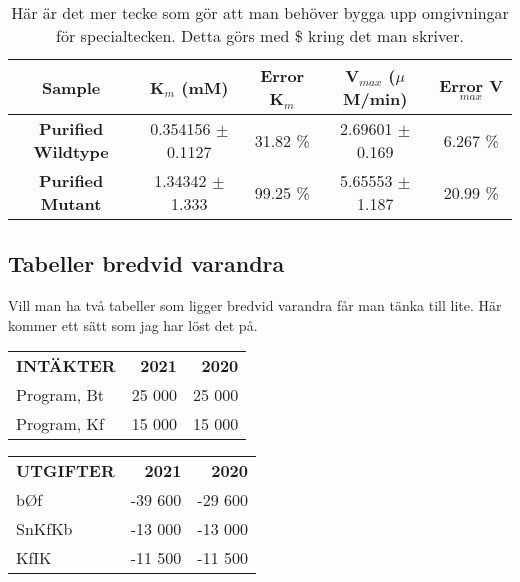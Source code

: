 \documentclass[]{article} %
\begin{document}
\begin{table}[H]
    \centering
        \caption{Här är det mer tecke som gör att man behöver bygga upp omgivningar för specialtecken. Detta görs med \$ kring det man skriver.}
    \begin{tabular}{|c|c|c|c|c|} \hline \hline
         \textbf{Sample} &  \textbf{K$_m$ (mM)} & \textbf{Error K$_m$} & \textbf{V$_{max}$ ($\mu$M/min)} & \textbf{Error V$_{max}$}\\ \hline
         \textbf{Purified Wildtype} & 0.354156 $\pm$ 0.1127 & 31.82 \% & 2.69601 $\pm$ 0.169 & 6.267 \% \\ \hline 
         \textbf{Purified Mutant} & 1.34342 $\pm$ 1.333 & 99.25 \% & 5.65553 $\pm$ 1.187 & 20.99 \% \\ \hline \hline
    \end{tabular}
    \label{tab:KmVmax}
\end{table}

\subsection{Tabeller bredvid varandra}
Vill man ha två tabeller som ligger bredvid varandra får man tänka till lite. Här kommer ett sätt som jag har löst det på.

\begin{center}
    

\begin{table}[!htb]
    \begin{minipage}{.5\linewidth}
      \centering
        \begin{tabular}{l r r}
            \textbf{INTÄKTER} & \textbf{2021} & \textbf{2020} \\
            Program, Bt & 25 000 & 25 000 \\
            Program, Kf & 15 000 & 15 000 \\
            
        \end{tabular}
    \end{minipage}%
    \begin{minipage}{.5\linewidth}
      \centering
        \begin{tabular}{l r r}
            \textbf{UTGIFTER} & \textbf{2021} & \textbf{2020} \\
            bØf & -39 600 & -29 600 \\
            SnKfKb & -13 000 & -13 000\\
            KfIK & -11 500 & -11 500 \\
            
        \end{tabular}
    \end{minipage}
\end{table}

\end{center}
\end{document}
